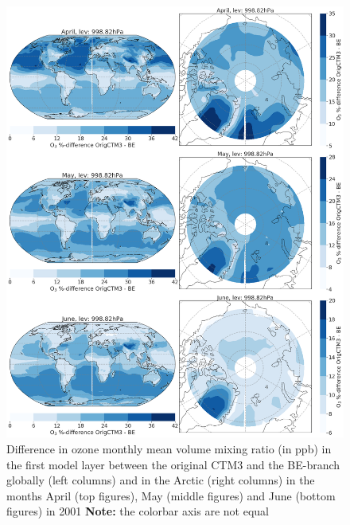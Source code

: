 \begin{figure}[h]
    \centering
    \includegraphics[width = \linewidth]{Chapter6_Results/images/Orig_BE_comp/BE_origPD_vmr_lev0_AprJune_2001.png}
    \caption{Difference in ozone monthly mean volume mixing ratio (in ppb) in the first model layer between the original CTM3 and the BE-branch globally (left columns) and in the Arctic (right columns) in the months April (top figures), May (middle figures) and June (bottom figures) in 2001 \textbf{Note:} the colorbar axis are not equal}
    \label{fig:BE_origPD_vmr_lev0_AprJun}
\end{figure}


